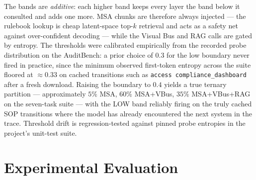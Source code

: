 \documentclass[conference]{IEEEtran}
\begin{document}
The bands are \textit{additive}: each higher band keeps every layer the band below it consulted and adds one more. MSA chunks are therefore always injected --- the rulebook lookup is cheap latent-space top-$k$ retrieval and acts as a safety net against over-confident decoding --- while the Visual Bus and RAG calls are gated by entropy. The thresholds were calibrated empirically from the recorded probe distribution on the AuditBench: a prior choice of $0.3$ for the low boundary never fired in practice, since the minimum observed first-token entropy across the suite floored at $\approx 0.33$ on cached transitions such as \texttt{access compliance\_dashboard} after a fresh download. Raising the boundary to $0.4$ yields a true ternary partition --- approximately $5\%$ MSA, $60\%$ MSA+VBus, $35\%$ MSA+VBus+RAG on the seven-task suite --- with the LOW band reliably firing on the truly cached SOP transitions where the model has already encountered the next system in the trace. Threshold drift is regression-tested against pinned probe entropies in the project's unit-test suite.

\section{Experimental Evaluation}
\end{document}
